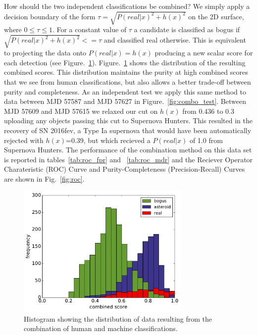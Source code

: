 \documentclass[a4paper,fleqn,usenatbib]{mnras}
\begin{document}
How should the two independent classifications be combined?  We simply apply a decision boundary of the form $\tau = \sqrt{P(real|x)^2 + h(x)^2}$ on the 2D surface, where $0\leq\tau\leq1$.  For a constant value of $\tau$ a candidate is classified as bogus if $\sqrt{P(real|x)^2 + h(x)^2} <= \tau$ and classified real otherwise.  This is equivalent to projecting the data onto $P(real|x)=h(x)$ producing a new scalar score for each detection (see Figure.~\ref{fig:combo_hist}).  Figure.~\ref{fig:combo_hist} shows the distribution of the resulting combined scores.  This distribution maintains the purity at high combined scores that we see from human classifications, but also allows a better trade-off between purity and completeness.  As an independent test we apply this same method to data between MJD 57587 and MJD 57627 in
Figure.~\ref{fig:combo_test}.  Between MJD 57609 and MJD 57615 we relaxed our cut on $h(x)$ from 0.436 to 0.3 uploading any objects passing this cut to Supernova Hunters.  This resulted in the recovery of SN 2016fev, a Type Ia supernova that would have been automatically rejected with $h(x)$=0.39, but which recieved a $P(real|x)$ of 1.0 from Supernova Hunters.  The performance of the combination method on this data set is reported in tables~\ref{tab:roc_fpr} and ~\ref{tab:roc_mdr} and the Reciever Operator Charateristic (ROC) Curve and Purity-Completeness (Precision-Recall) Curves are shown in Fig.~\ref{fig:roc}.

\begin{figure}
   \includegraphics[width=84mm]{figs/combo_hist.pdf}
   \caption{Histogram showing the distribution of data resulting from the combination of human and machine classifications.}
   \label{fig:combo_hist} 
\end{figure}
\end{document}
